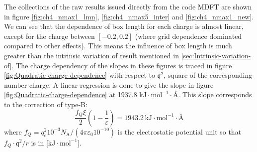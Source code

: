 The collections of the raw results issued directly from the code MDFT
are shown in figure \ref{fig:ch4_nmax1_lmn}, \ref{fig:ch4_nmax5_inter}
and \ref{fig:ch4_nmax1_new}. We can see that the dependence of box
length for each charge is almost linear, except for the charge between
$\left[-0.2,0.2\right]$ (where grid dependence dominated compared
to other effects). This means the influence of box length is much
greater than the intrinsic variation of result mentioned in \ref{sec:Intrinsic-variation-of}.
The charge dependency of the slopes in these figures is traced in
figure \ref{fig:Quadratic-charge-dependence} with respect to $\mathfrak{q}^{2}$,
square of the corresponding number charge. A linear regression is
done to give the slope in figure \ref{fig:Quadratic-charge-dependence}
at 1937.8 $\mathrm{kJ}\cdot\mathrm{mol^{-1}}\cdot\textrm{Å}$. This
slope corresponds to the correction of type-B:
\begin{equation}
\dfrac{f_{Q}\xi}{2}\left(1-\dfrac{1}{\varepsilon}\right)=1943.2\,\mathrm{kJ}\cdot\mathrm{mol^{-1}}\cdot\textrm{Å}
\end{equation}
where $f_{Q}=q_{e}^{2}10^{-3}N_{\mathrm{A}}/(4\pi\varepsilon_{0}10^{-10})$
is the electrostatic potential unit so that $f_{Q}\cdot\mathfrak{q}^{2}/r$
is in {[}$\mathrm{kJ\cdot mol^{-1}}${]}.

